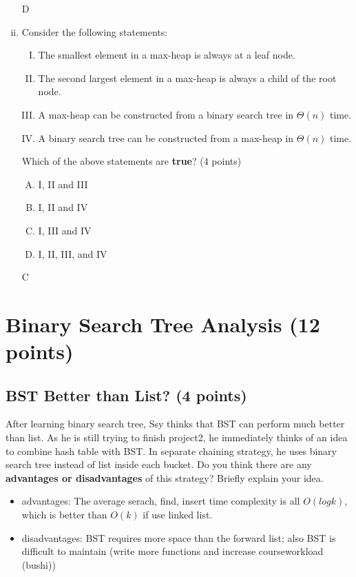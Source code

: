 \documentclass[11pt]{exam}
\begin{document}
\begin{enumerate}[i)]
    \begin{solution}
    D%
    \end{solution}
    
    \item Consider the following statements:
    \begin{enumerate}[I.]
        \item The smallest element in a max-heap is always at a leaf node.
        \item The second largest element in a max-heap is always a child of the root node.
        \item A max-heap can be constructed from a binary search tree in $\Theta(n)$ time.
        \item A binary search tree can be constructed from a max-heap in $\Theta(n)$ time.
    \end{enumerate}
    Which of the above statements are \textbf{true}? (4 points)
    \begin{enumerate}[A.]
        \item I, II and III
        \item I, II and IV
        \item I, III and IV
        \item I, II, III, and IV
    \end{enumerate}
    
    \begin{solution}
    C%
    \end{solution}
\end{enumerate}

\section{Binary Search Tree Analysis (12 points)}
\subsection{BST Better than List? (4 points)}
After learning binary search tree, Ssy thinks that BST can perform much better than list. As he is still trying to finish project2, he immediately thinks of an idea to combine hash table with BST. In separate chaining strategy, he uses binary search tree instead of list inside each bucket. Do you think there are any \textbf{advantages or disadvantages} of this strategy? Briefly explain your idea.

\begin{solution}
\begin{itemize}
    \item advantages: The average serach, find, insert time complexity is all $O(log k)$, which 
    is better than $O(k)$ if use linked list.
    \item disadvantages: BST requires more space than the forward list; also BST is difficult to maintain (write more functions and increase courseworkload (bushi))
\end{itemize}
\end{solution}
\end{document}
